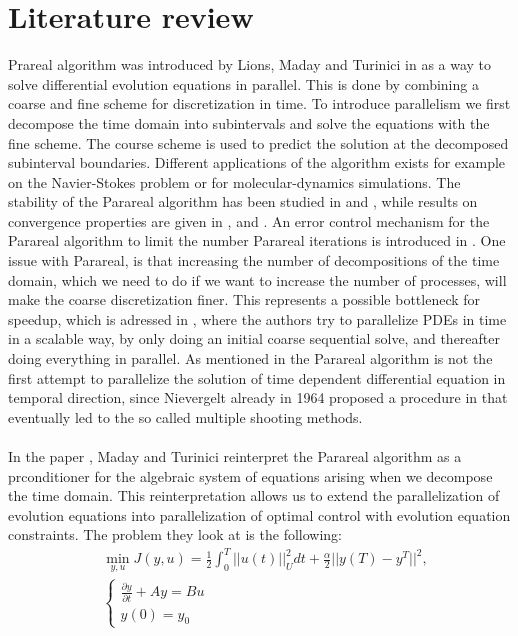 \chapter{Literature review}
Prareal algorithm was introduced by Lions, Maday and Turinici in \cite{lions2001resolution} as a way to solve differential evolution equations in parallel. This is done by combining a coarse and fine scheme for discretization in time. To introduce parallelism we first decompose the time domain into subintervals and solve the equations with the fine scheme. The course scheme is used to predict the solution at the decomposed subinterval boundaries. Different applications of the algorithm exists for example on the Navier-Stokes problem\cite{fischer2005parareal} or for molecular-dynamics simulations\cite{baffico2002parallel}. The stability of the Parareal algorithm has been studied in \cite{staff2005stability} and \cite{bal2005convergence}, while results on convergence properties are given in \cite{lions2001resolution},\cite{bal2005convergence} and \cite{gander2007superlinear}. An error control mechanism for the Parareal algorithm to limit the number Parareal iterations is introduced in \cite{lepsa2010efficient}. One issue with Parareal, is that increasing the number of decompositions of the time domain, which we need to do if we want to increase the number of processes, will make the coarse discretization finer. This represents a possible bottleneck for speedup, which is adressed in \cite{rao2014adjoint}, where the authors try to parallelize PDEs in time in a scalable way, by only doing an initial coarse sequential solve, and thereafter doing everything in parallel. As mentioned in \cite{gander2007superlinear} the Parareal algorithm is not the first attempt to parallelize the solution of time dependent differential equation in temporal direction, since Nievergelt already in 1964 proposed a procedure in \cite{nievergelt1964parallel} that eventually led to the so called multiple shooting methods.
\\
\\
In the paper \cite{maday2002parareal}, Maday and Turinici reinterpret the Parareal algorithm as a prconditioner for the algebraic system of equations arising when we decompose the time domain. This reinterpretation allows us to extend the parallelization of evolution equations into parallelization of optimal control with evolution equation constraints. The problem they look at is the following:
\begin{align*}
&\min_{y,u}J(y,u) = \frac{1}{2}\int_0^T||u(t)||_U^2dt + \frac{\alpha}{2}||y(T)-y^T||^2,\\
&\left\{
     \begin{array}{lr}
       	\frac{\partial y}{\partial t}+Ay = Bu\\
       	   y(0)=y_0
     \end{array}
   \right.
\end{align*}
